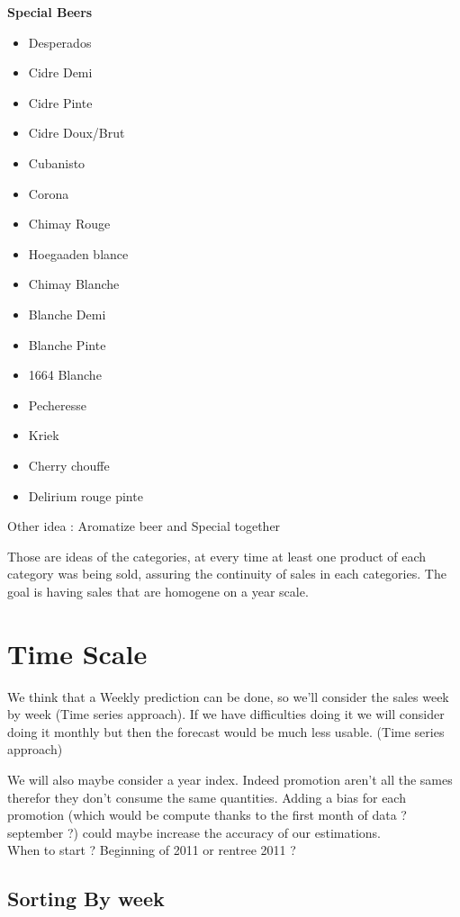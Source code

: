 \documentclass{report}
\begin{document}
\begin{multicols}{4}
\columnbreak

\textbf{Special Beers}
\begin{itemize}
\item Desperados
\item Cidre Demi
\item Cidre Pinte
\item Cidre Doux/Brut
\item Cubanisto
\item Corona
\item Chimay Rouge
\item Hoegaaden blance
\item Chimay Blanche
\item Blanche Demi
\item Blanche Pinte
\item 1664 Blanche
\item Pecheresse
\item Kriek
\item Cherry chouffe
\item Delirium rouge pinte
\end{itemize}

\end{multicols}


Other idea : Aromatize beer and Special together

Those are ideas of the categories, at every time at least one product of each category was being sold, assuring the continuity of sales in each categories. The goal is having sales that are homogene on a year scale.


\section{Time Scale}

We think that a Weekly prediction can be done, so we'll consider the sales week by week (Time series approach). If we have difficulties doing it we will consider doing it monthly but then the forecast would be much less usable. (Time series approach)

We will also maybe consider a year index. Indeed promotion aren't all the sames therefor they don't consume the same quantities. Adding a bias for each promotion (which would be compute thanks to the first month of data ? september ?) could maybe increase the accuracy of our estimations.\\
When to start ? Beginning of 2011 or rentree 2011 ?

\subsection{Sorting By week}
\end{document}
